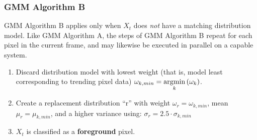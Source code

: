 \subsubsection{GMM Algorithm B}
GMM Algorithm B applies only when $X_t$ does \textit{not} have a matching distribution model. 
Like GMM Algorithm A, the steps of GMM Algorithm B repeat for each pixel in the current frame, and may likewise be executed in parallel on a capable system.
\begin{enumerate}
	\item Discard distribution model with lowest weight (that is, model least corresponding to trending pixel data) $\omega_{k,min}=\operatorname*{\arg\!\min}\limits_k\left(\omega_k\right)$.
	\item Create a replacement distribution ``r'' with weight $\omega_{r}=\omega_{k,min}$, mean $\mu_r=\mu_{k,min}$, and a higher variance using: $\sigma_r=2.5\cdot\sigma_{k,min}$
	\item $X_t$ is classified as a \textbf{foreground} pixel.
\end{enumerate}

\FloatBarrier
